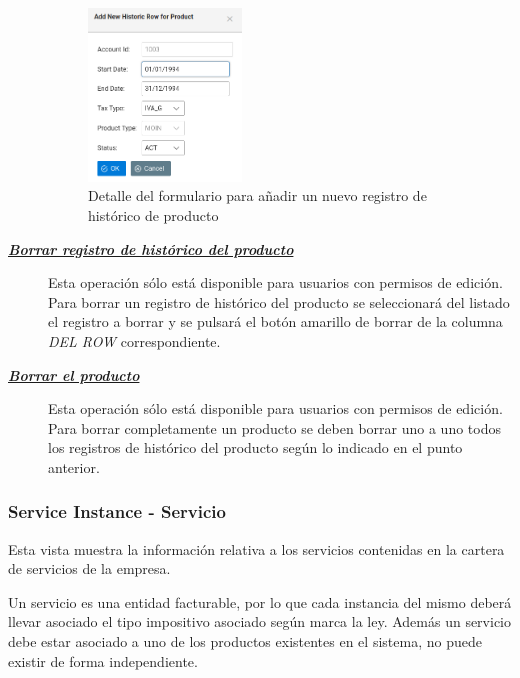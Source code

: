 \begin{description}
\begin{figure}
  \centering
  \includegraphics[width=0.4\textwidth]{imaxes/nuevo-historico-producto.png}
  \caption{Detalle del formulario para añadir un nuevo registro de histórico de producto}
  \label{fig:nuevo-historico-producto}
\end{figure}


\item[\underline{\textsl{\textbf{Borrar registro de histórico del producto}}}] Esta operación sólo está disponible para usuarios con permisos de edición.
Para borrar un registro de histórico del producto se seleccionará del listado el registro a borrar y se pulsará el botón amarillo de borrar de la columna \textit{DEL ROW} correspondiente.

\item[\underline{\textsl{\textbf{Borrar el producto}}}] Esta operación sólo está disponible para usuarios con permisos de edición.
Para borrar completamente un producto se deben borrar uno a uno todos los registros de histórico del producto según lo indicado en el punto anterior. 
\end{description}


\subsubsection{Service Instance - Servicio}
\label{sub:service}

Esta vista muestra la información relativa a los servicios contenidas en la cartera de servicios de la empresa.

Un servicio es una entidad facturable, por lo que cada instancia del mismo deberá llevar asociado el tipo impositivo asociado según marca la ley. Además un servicio debe estar asociado a uno de los productos existentes en el sistema, no puede existir de forma independiente.

